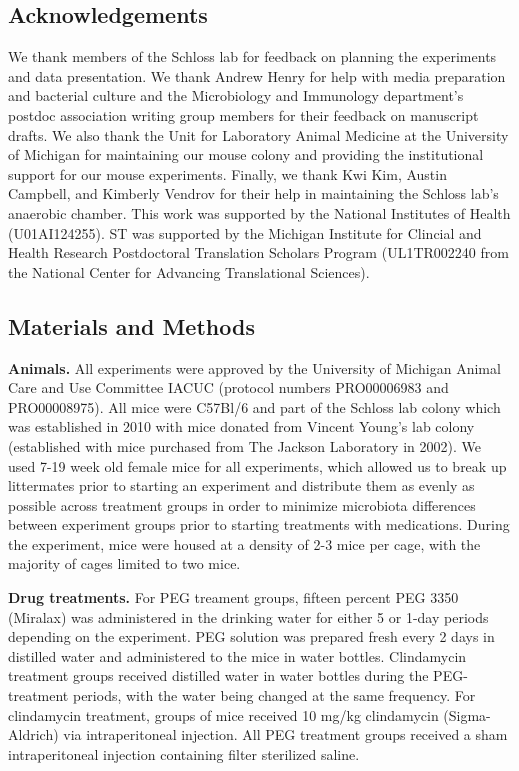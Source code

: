 \documentclass[
  11pt,
]{article}
\begin{document}
\hypertarget{acknowledgements}{%
\subsection{Acknowledgements}\label{acknowledgements}}

We thank members of the Schloss lab for feedback on planning the
experiments and data presentation. We thank Andrew Henry for help with
media preparation and bacterial culture and the Microbiology and
Immunology department's postdoc association writing group members for
their feedback on manuscript drafts. We also thank the Unit for
Laboratory Animal Medicine at the University of Michigan for maintaining
our mouse colony and providing the institutional support for our mouse
experiments. Finally, we thank Kwi Kim, Austin Campbell, and Kimberly
Vendrov for their help in maintaining the Schloss lab's anaerobic
chamber. This work was supported by the National Institutes of Health
(U01AI124255). ST was supported by the Michigan Institute for Clincial
and Health Research Postdoctoral Translation Scholars Program
(UL1TR002240 from the National Center for Advancing Translational
Sciences).

\hypertarget{materials-and-methods}{%
\subsection{Materials and Methods}\label{materials-and-methods}}

\textbf{Animals.} All experiments were approved by the University of
Michigan Animal Care and Use Committee IACUC (protocol numbers
PRO00006983 and PRO00008975). All mice were C57Bl/6 and part of the
Schloss lab colony which was established in 2010 with mice donated from
Vincent Young's lab colony (established with mice purchased from The
Jackson Laboratory in 2002). We used 7-19 week old female mice for all
experiments, which allowed us to break up littermates prior to starting
an experiment and distribute them as evenly as possible across treatment
groups in order to minimize microbiota differences between experiment
groups prior to starting treatments with medications. During the
experiment, mice were housed at a density of 2-3 mice per cage, with the
majority of cages limited to two mice.

\textbf{Drug treatments.} For PEG treament groups, fifteen percent PEG
3350 (Miralax) was administered in the drinking water for either 5 or
1-day periods depending on the experiment. PEG solution was prepared
fresh every 2 days in distilled water and administered to the mice in
water bottles. Clindamycin treatment groups received distilled water in
water bottles during the PEG-treatment periods, with the water being
changed at the same frequency. For clindamycin treatment, groups of mice
received 10 mg/kg clindamycin (Sigma-Aldrich) via intraperitoneal
injection. All PEG treatment groups received a sham intraperitoneal
injection containing filter sterilized saline.
\end{document}
